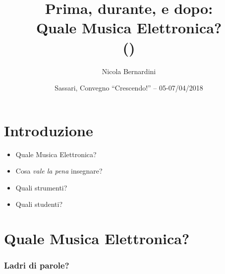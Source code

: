 \documentclass[compress,\mode]{beamer}
\title[Quale ME?]
{%
  Prima, durante, e dopo:\\
  Quale Musica Elettronica?\\
  {\tiny (\rcstag)}
}
\author{%
  Nicola Bernardini\\
    \href{mailto:\cpholderemail}{\cpholderemail}
}
\institute[SMERM]%
{%
  \href{http://www.conservatoriopollini.it}
     {Conservatorio di Musica ``Cesare Pollini'' -- Padova}
}
\date[Crescendo! Sassari, 05-07/04/2018]{Sassari, Convegno ``Crescendo!'' -- 05-07/04/2018}
\begin{document}
\setcounter{ms}{0}
  
\begin{frame}
  \titlepage
\end{frame}

\section{Introduzione}

\begin{frame}

  \begin{itemize}[<+- | alert@+>]

     \item Quale Musica Elettronica?

     \item Cosa \emph{vale la pena} insegnare?

     \item Quali strumenti?

     \item Quali studenti?

  \end{itemize}

\end{frame}

\section{Quale Musica Elettronica?}

\begin{frame}

\pause
\begin{figure}
\end{figure}

\end{frame}

\begin{frame}

\begin{figure}
\end{figure}

\end{frame}

\begin{frame}
  \frametitle<+->{Ladri di parole?}




\end{frame}
\end{document}
